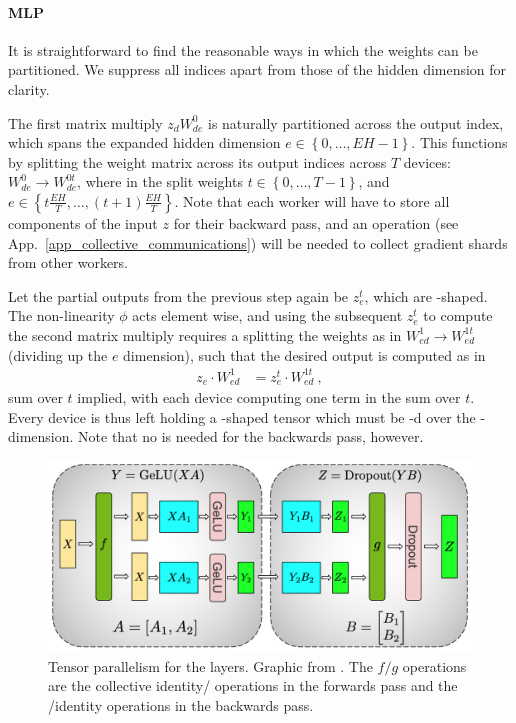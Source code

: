 \documentclass[11pt]{article}
\begin{document}
\paragraph{MLP}
It is straightforward to find the reasonable ways in which the weights can be partitioned. We
suppress all indices apart from those of the hidden dimension for clarity.

The first matrix multiply $ z _{ d }W ^{ 0 } _{ d e } $ is naturally partitioned across the output
index, which spans the expanded hidden dimension $ e\in \left \{ 0, \ldots , EH-1 \right \} $. This
functions by splitting the weight matrix across its output indices across $ T $ devices:  $ W ^{ 0 }
		_{ d e } \longrightarrow W ^{ 0t } _{ d e }$, where in the split weights $ t\in \left \{ 0,
	\ldots , T-1  \right \} $, and $ e \in \left \{ t\frac{  EH}{ T } ,
	\ldots ,\left ( t+1 \right ) \frac{ EH }{ T } \right \} $. Note that each worker will have to store
all components of the input $ z $ for their backward pass, and an  operation
(see App.~\ref{app_collective_communications}) will be needed to collect gradient shards from other
workers.


Let the partial outputs from the previous step again be $ z _{ e } ^{ t } $, which are
-shaped. The non-linearity $ \phi $ acts element wise, and using the subsequent
$ z _{ e } ^{ t }  $ to compute the second matrix multiply requires a splitting the weights as in $ W ^{ 1 }
		_{ e d } \longrightarrow W ^{ 1t } _{  e d}$ (dividing up the $ e $ dimension), such that the desired output is computed as in
\begin{align}
	z _{ e }\cdot W ^{ 1 }_{ ed } & =z _{ e }^{ t }\cdot W ^{ 1t }_{ ed } \ ,
\end{align}
sum over $ t $ implied, with each device computing one term in the sum over $ t $. Every device is thus
left holding a -shaped tensor which must be -d over the
-dimension. Note that no  is needed for the
backwards pass, however.



\begin{figure}[ht]
	\centering
	\includegraphics[scale=.33]{figures/mlp_mp_2.png}
	\caption{Tensor parallelism for the  layers. Graphic from
		\cite{shoeybi2020megatronlm}. The $ f/g $ operations are the collective
		identity/ operations in the forwards pass and the /identity
		operations in the backwards pass.}
	\label{fig_mlp_tensor_parallel}
\end{figure}
\end{document}
